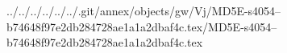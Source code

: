 ../../../../../../.git/annex/objects/gw/Vj/MD5E-s4054--b74648f97e2db284728ae1a1a2dbaf4c.tex/MD5E-s4054--b74648f97e2db284728ae1a1a2dbaf4c.tex